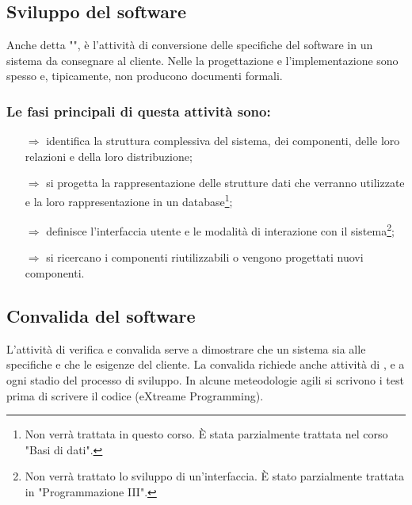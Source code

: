 \subsection{Sviluppo del software}

Anche detta "", è l'attività
di conversione delle specifiche del software in un sistema da consegnare al cliente.
Nelle  la progettazione e l'implementazione
sono spesso  e, tipicamente, non producono documenti formali. 

\subsubsection{Le fasi principali di questa attività sono:}

\begin{itemize}
    \item [$\Rightarrow$]  identifica la struttura
    complessiva del sistema, dei componenti, delle loro relazioni e della loro distribuzione; 
    \item [$\Rightarrow$]  si progetta la rappresentazione
    delle strutture dati che verranno utilizzate e la loro rappresentazione in un database\footnote{Non verrà trattata
    in questo corso. È stata parzialmente trattata nel corso "Basi di dati".}; 
    \item [$\Rightarrow$]  definisce l'interfaccia 
    utente e le modalità di interazione con il sistema\footnote{Non verrà trattato lo sviluppo di un'interfaccia. È stato parzialmente trattata
    in "Programmazione III".};
    \item [$\Rightarrow$]  si ricercano i componenti
    riutilizzabili o vengono progettati nuovi componenti.
\end{itemize}


\subsection{Convalida del software}

L'attività di verifica e convalida serve a dimostrare che un sistema sia 
 alle specifiche e che 
le esigenze del cliente.
La convalida richiede anche attività di ,  e 
a ogni stadio del processo di sviluppo. In alcune meteodologie agili
si scrivono i test prima di scrivere il codice (eXtreame Programming).

